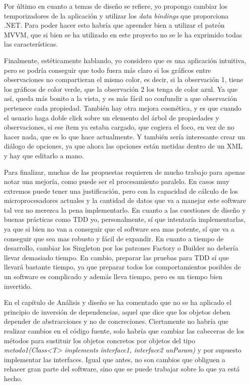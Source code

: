 Por \'ultimo en cuanto a temas de dise\~no se refiere, yo propongo cambiar los 
temporizadores de la aplicaci\'on y utilizar los \emph{data bindings} que 
proporciona .NET. Para poder hacer esto habr\'ia que aprender bien a utilizar 
el patr\'on MVVM, que si bien se ha utilizado en este proyecto no se le ha 
exprimido todas las caracter\'isticas.

Finalmente, est\'eticamente hablando, yo considero que es una aplicaci\'on 
intuitiva, pero se podr\'ia conseguir que todo fuera m\'as claro si los 
gr\'aficos entre observaciones no compartieran el mismo color,
es decir, si la observaci\'on 1, tiene los gr\'aficos de color verde, que la 
observaci\'on 2 los tenga de color azul. Ya que as\'i, queda m\'as bonito a la 
vista, y es m\'as f\'acil no confundir a que observaci\'on pertenece cada 
propiedad. Tambi\'en hay otra mejora cosm\'etica, y es que cuando el usuario 
haga doble click sobre un elemento del \'arbol de propiedades y observaciones, 
si ese \'item ya estaba cargado, que cogiera el foco, en vez de no hacer nada, 
que es lo que hace actualmente. Y tambi\'en ser\'ia interesante crear un 
di\'alogo de opciones, ya que ahora las opciones est\'an metidas dentro de un 
XML y hay que editarlo a mano.

Para finalizar, muchas de las propuestas requieren de mucho trabajo para apenas 
notar una mejor\'ia, como puede ser el procesamiento paralelo. En casos 
muy extremos puede tener una justificaci\'on, pero con la capacidad de 
c\'alculo de los microprocesadores actuales y la cantidad de datos que va a 
manejar este software tal vez no merezca la pena implementarlo. En cuanto a las 
cuestiones de dise\~no y buenas pr\'acticas como TDD yo, personalmente, s\'i 
que intentar\'ia implementarlas, ya que si bien no van a conseguir que el 
software sea mas potente, s\'i que va a conseguir que sea mas robusto y f\'acil 
de expandir. En cuanto a tiempo de desarrollo, cambiar los Singleton por los 
patrones Factory o Builder no deber\'ia llevar demasiado tiempo. En cambio, 
preparar las pruebas para TDD s\'i que llevar\'a bastante tiempo, ya que 
preparar todos los comportamientos posibles de un software es complicado y 
adem\'as lleva tiempo, pero es un tiempo bien invertido.

En el cap\'itulo de An\'alisis y dise\~no se ha comentado que no se ha aplicado 
el principio de inversi\'on de dependencias, aquel que dice que los objetos 
deben depender de abstracciones y no de concreciones. Ciertamente no habr\'ia 
que realizar cambios en el c\'odigo fuente, solo habr\'ia que cambiar las 
cabeceras de los m\'etodos para sustituir los objetos concretos por objetos del 
tipo \emph{metodo1(Class<T> implements interface1, interface2 unParam)} y por 
supuesto implementar las interfaces. Igual que antes, no son cambios que 
obliguen a rehacer gran parte del software, sino que se puede trabajar sobre lo 
que ya est\'a hecho.

